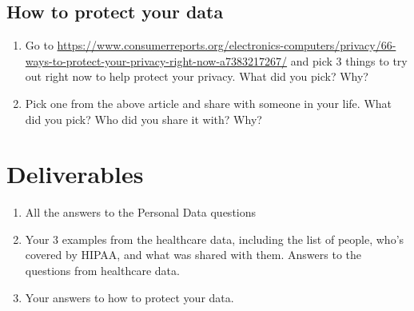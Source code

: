 \documentclass[12pt]{article}
\begin{document}
\subsection*{How to protect your data}
\begin{enumerate}
    \item Go to \url{https://www.consumerreports.org/electronics-computers/privacy/66-ways-to-protect-your-privacy-right-now-a7383217267/} and pick 3 things to try out right now to help protect your privacy.  What did you pick? Why?
    \item Pick one from the above article and share with someone in your life.  What did you pick? Who did you share it with? Why?
\end{enumerate}

\section*{Deliverables}

\begin{enumerate}
    \item All the answers to the Personal Data questions
    \item Your 3 examples from the healthcare data, including the list of people, who's covered by HIPAA, and what was shared with them. Answers to the questions from healthcare data.
    \item Your answers to how to protect your data.

\end{enumerate}
\end{document}
